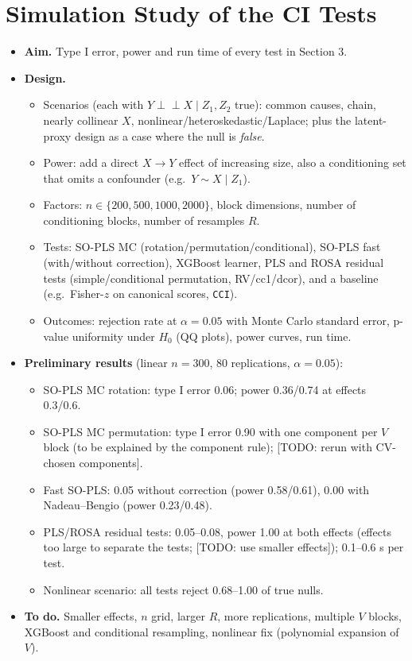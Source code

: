 \documentclass[10pt,leqno]{amsart}
\newcommand{\todo}[1]{{\color{red}[TODO: #1]}}
\newcommand{\ci}{\perp\!\!\!\perp}          %
\begin{document}
\section{Simulation Study of the CI Tests}
\begin{itemize}
\item \textbf{Aim.} Type I error, power and run time of every test in Section 3.
\item \textbf{Design.}
  \begin{itemize}
  \item Scenarios (each with $Y\ci X\mid Z_1,Z_2$ true): common causes, chain,
    nearly collinear $X$, nonlinear/heteroskedastic/Laplace; plus the
    latent-proxy design as a case where the null is \emph{false}.
  \item Power: add a direct $X\to Y$ effect of increasing size, also a
    conditioning set that omits a confounder (e.g.\ $Y\sim X\mid Z_1$).
  \item Factors: $n\in\{200,500,1000,2000\}$, block dimensions, number of
    conditioning blocks, number of resamples $R$.
  \item Tests: SO-PLS MC (rotation/permutation/conditional), SO-PLS fast (with/without
    correction), XGBoost learner, PLS and ROSA residual tests (simple/conditional
    permutation, RV/cc1/dcor), and a baseline (e.g.\ Fisher-$z$ on canonical
    scores, \texttt{CCI}).
  \item Outcomes: rejection rate at $\alpha=0.05$ with Monte Carlo standard error,
    p-value uniformity under $H_0$ (QQ plots), power curves, run time.
  \end{itemize}
\item \textbf{Preliminary results} (linear $n=300$, 80 replications, $\alpha=0.05$):
  \begin{itemize}
  \item SO-PLS MC rotation: type I error 0.06; power 0.36/0.74 at effects 0.3/0.6.
  \item SO-PLS MC permutation: type I error 0.90 with one component per $V$ block
    (to be explained by the component rule); \todo{rerun with CV-chosen components}.
  \item Fast SO-PLS: 0.05 without correction (power 0.58/0.61), 0.00 with
    Nadeau--Bengio (power 0.23/0.48).
  \item PLS/ROSA residual tests: 0.05--0.08, power 1.00 at both effects (effects
    too large to separate the tests; \todo{use smaller effects}); 0.1--0.6 s per test.
  \item Nonlinear scenario: all tests reject 0.68--1.00 of true nulls.
  \end{itemize}
\item \textbf{To do.} Smaller effects, $n$ grid, larger $R$, more replications,
  multiple $V$ blocks, XGBoost and conditional resampling, nonlinear fix
  (polynomial expansion of $V$).
\end{itemize}
\end{document}
